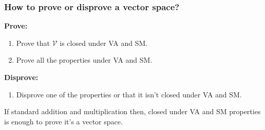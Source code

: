     \subsubsection{How to prove or disprove a vector space?}
    \begin{process}

        \textbf{Prove:}
        \begin{enumerate}
            \item Prove that $\mathcal{V}$ is closed under VA and SM.
            \item Prove all the properties under VA and SM.
        \end{enumerate}
        \vspace{1em}

        \textbf{Disprove:}
        \begin{enumerate}
            \item Disprove one of the properties or that it isn't closed under VA and SM.
        \end{enumerate}
    \end{process}

    \begin{warning}
        If standard addition and multiplication then, closed under VA and SM properties is enough to prove it's a vector space.
    \end{warning}


